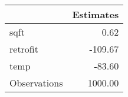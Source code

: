 \begin{tabular}{lr}
\toprule
{} &  Estimates \\
\midrule
sqft         &       0.62 \\
retrofit     &    -109.67 \\
temp         &     -83.60 \\
Observations &    1000.00 \\
\bottomrule
\end{tabular}
